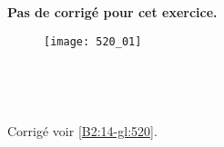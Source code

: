 \normaltrue \difficilefalse \tdifficilefalse
\correctionfalse


\setcounter{question}{0}
\ifcorrection
\else
\textbf{Pas de corrigé pour cet exercice.}
\fi

\ifprof
\else


\begin{figure}[H]
\centering
\texttt{[image: 520\_01]}
\end{figure}
\fi

\ifprof ~\\
\else
\fi

\ifprof ~\\
\else
\fi


\ifprof
\else
\begin{flushright}
\footnotesize{Corrigé  voir \ref{B2:14-gl:520}.}
\end{flushright}%
\fi